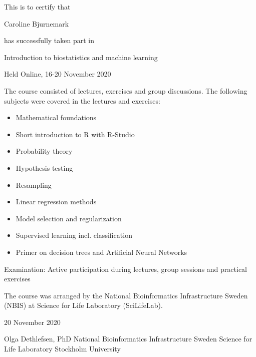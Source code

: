 \documentclass[12pt]{article}\usepackage[]{graphicx}\usepackage[]{color}
\newcommand{\courseName}{Introduction to biostatistics and machine learning}
\newcommand{\courseLocation}{Online}
\newcommand{\courseDate}{16-20 November 2020}
\newcommand{\courseLastDay}{20 November 2020}
\newcommand{\courseExaminer}{Olga Dethlefsen, PhD}
\begin{document}
\large
This is to certify that 


\LARGE
Caroline Bjurnemark

\large
has successfully taken part in \newline

\LARGE
\begin{center}{\courseName}  \end{center} 


\large
\begin{center} Held  {\courseLocation}, {\courseDate} \end{center} 

\vspace{5mm}
\normalsize
The course consisted of lectures, exercises and group discussions. The following subjects were covered in the lectures and exercises:
\begin{itemize}
  \item Mathematical foundations
  \item Short introduction to R with R-Studio
  \item Probability theory
  \item Hypothesis testing
  \item Resampling
  \item Linear regression methods
  \item Model selection and regularization
  \item Supervised learning incl. classification
  \item Primer on decision trees and Artificial Neural Networks
\end{itemize}


\vspace{5mm}
Examination: \newline
Active participation during lectures, group sessions and practical exercises

\vspace{8mm}
The course was arranged by the National Bioinformatics Infrastructure Sweden (NBIS) at Science for Life Laboratory (SciLifeLab).


\vspace{8mm}
 {\courseLastDay}
\vspace{22mm}


{\courseExaminer} \newline
\small
National Bioinformatics Infrastructure Sweden \newline
Science for Life Laboratory \newline
Stockholm University \newline
\end{document}
